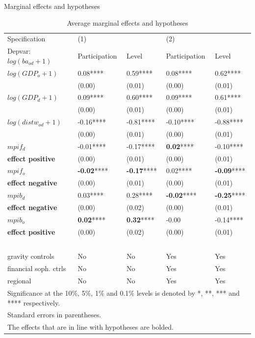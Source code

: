 \documentclass{beamer}
\begin{document}
\begin{frame}{Marginal effects and hypotheses}
\tiny
\begin{table}[!h]
\centering
\begin{tabular}{ l l l l l}
\hline
Specification&(1)&&(2)& \\
Depvar: $log(ba_{od}+1)$&Participation&Level&Participation&Level\\
\hline
$log(GDP_{o}+1)$&0.08****&0.59****&0.08****&0.62****\\
&(0.00)&(0.01)&(0.00)&(0.01)\\
$log(GDP_{d}+1)$&0.09****&0.60****&0.09****&0.61****\\
&(0.00)&(0.01)&(0.00)&(0.01)\\
$log(distw_{od}+1)$&-0.16****&-0.81****&-0.10****&-0.88****\\
&(0.00)&(0.01)&(0.00)&(0.01)\\
$mpif_{d}$&-0.01****&-0.17****&\textbf{0.02}****&-0.10****\\
\textbf{effect positive}  &(0.00)&(0.01)&(0.00)&(0.01)\\
$mpif_{o}$&\textbf{-0.02}****&\textbf{-0.17}****&0.02****&\textbf{-0.09}****\\
\textbf{effect negative} &(0.00)&(0.01)&(0.00)&(0.01)\\
$mpib_{d}$&0.03****&0.28****&\textbf{-0.02}****&\textbf{-0.25}****\\
\textbf{effect negative} &(0.00)&(0.02)&(0.00)&(0.01)\\
$mpib_{o}$&\textbf{0.02}****&\textbf{0.32}****&-0.00&-0.14****\\
\textbf{effect positive} &(0.00)&(0.02)&(0.00)&(0.01)\\
$$&&&&\\
gravity controls &No&No&Yes&Yes \\ 
financial soph. ctrls &No&No&Yes&Yes \\
regional &No&No&Yes&Yes \\
\hline
\multicolumn{5}{l}{\tiny Significance at the 10\%, 5\%, 1\% and 0.1\% levels is denoted by *, **, *** and **** respectively.}\\
\multicolumn{5}{l}{\tiny Standard errors in parentheses.}\\
\multicolumn{5}{l}{\tiny The effects that are in line with hypotheses are bolded.}\\
\end{tabular}
\caption{Average marginal effects and hypotheses}
\label{tab:results}
\end{table}
\end{frame}
\end{document}
